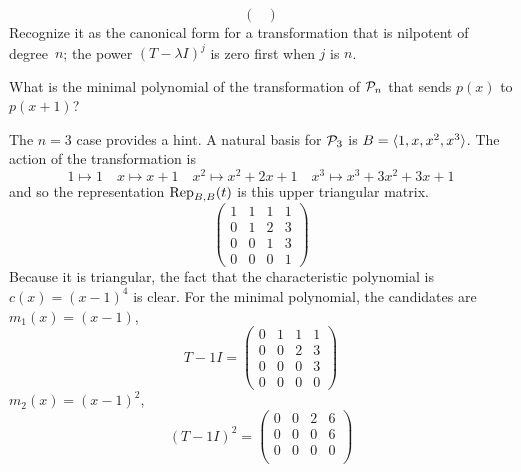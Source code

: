 \begin{exercises}
\begin{answer}
\begin{equation*}
\begin{pmatrix}
        \end{pmatrix}
      \end{equation*}
      Recognize it as the canonical form for a transformation that is 
      nilpotent of degree~$n$; the power $(T-\lambda I)^j$ is zero first
      when $j$ is $n$.
    \end{answer}
  \item 
    What is the minimal polynomial of the transformation of
    \( \polyspace_n \) that sends \( p(x) \) to \( p(x+1) \)?
    \begin{answer}
      The $n=3$ case provides a hint.
      A natural basis for $\polyspace_3$ is  
      $B=\sequence{1,x,x^2,x^3}$.
      The action of the transformation is
      \begin{equation*}
        1\mapsto 1
        \quad
        x\mapsto x+1
        \quad
        x^2\mapsto x^2+2x+1
        \quad
        x^3\mapsto x^3+3x^2+3x+1
      \end{equation*}
      and so the representation $\rep{t}{B,B}$ is this upper triangular matrix.
      \begin{equation*}
        \begin{pmatrix}
          1  &1  &1  &1  \\
          0  &1  &2  &3  \\
          0  &0  &1  &3  \\
          0  &0  &0  &1
        \end{pmatrix}
      \end{equation*}
      Because it is triangular, the fact that the characteristic polynomial is
      $c(x)=(x-1)^4$ is clear.
      For the minimal polynomial, the candidates are $m_1(x)=(x-1)$,
      \begin{equation*}
        T-1I=
        \begin{pmatrix}
          0  &1  &1  &1  \\
          0  &0  &2  &3  \\
          0  &0  &0  &3  \\
          0  &0  &0  &0
        \end{pmatrix}
      \end{equation*}
      $m_2(x)=(x-1)^2$, 
      \begin{equation*}
        (T-1I)^2=
        \begin{pmatrix}
          0  &0  &2  &6  \\
          0  &0  &0  &6  \\
          0  &0  &0  &0  \\

\end{pmatrix}
\end{equation*}
\end{answer}
\end{exercises}
